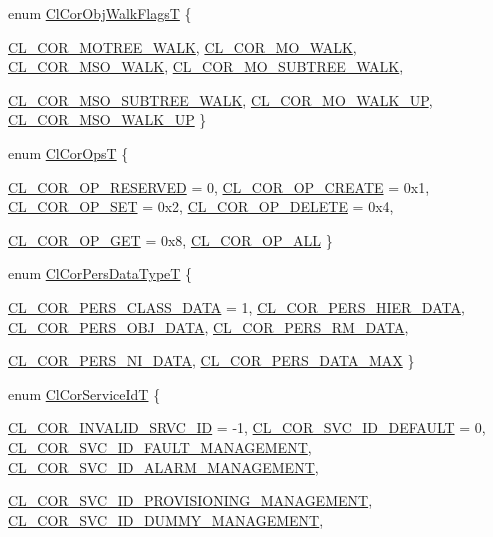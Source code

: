 \begin{CompactItemize}
enum \hyperlink{group__group13_ga331}{Cl\-Cor\-Obj\-Walk\-Flags\-T} \{ \par
\hyperlink{group__group13_gga331a136}{CL\_\-COR\_\-MOTREE\_\-WALK}, 
\hyperlink{group__group13_gga331a137}{CL\_\-COR\_\-MO\_\-WALK}, 
\hyperlink{group__group13_gga331a138}{CL\_\-COR\_\-MSO\_\-WALK}, 
\hyperlink{group__group13_gga331a139}{CL\_\-COR\_\-MO\_\-SUBTREE\_\-WALK}, 
\par
\hyperlink{group__group13_gga331a140}{CL\_\-COR\_\-MSO\_\-SUBTREE\_\-WALK}, 
\hyperlink{group__group13_gga331a141}{CL\_\-COR\_\-MO\_\-WALK\_\-UP}, 
\hyperlink{group__group13_gga331a142}{CL\_\-COR\_\-MSO\_\-WALK\_\-UP}
 \}
\item 
enum \hyperlink{group__group13_ga333}{Cl\-Cor\-Ops\-T} \{ \par
\hyperlink{group__group13_gga333a145}{CL\_\-COR\_\-OP\_\-RESERVED} =  0, 
\hyperlink{group__group13_gga333a146}{CL\_\-COR\_\-OP\_\-CREATE} =  0x1, 
\hyperlink{group__group13_gga333a147}{CL\_\-COR\_\-OP\_\-SET} =  0x2, 
\hyperlink{group__group13_gga333a148}{CL\_\-COR\_\-OP\_\-DELETE} =  0x4, 
\par
\hyperlink{group__group13_gga333a149}{CL\_\-COR\_\-OP\_\-GET} =  0x8, 
\hyperlink{group__group13_gga333a150}{CL\_\-COR\_\-OP\_\-ALL}
 \}
\item 
enum \hyperlink{group__group13_ga340}{Cl\-Cor\-Pers\-Data\-Type\-T} \{ \par
\hyperlink{group__group13_gga340a4}{CL\_\-COR\_\-PERS\_\-CLASS\_\-DATA} =  1, 
\hyperlink{group__group13_gga340a5}{CL\_\-COR\_\-PERS\_\-HIER\_\-DATA}, 
\hyperlink{group__group13_gga340a6}{CL\_\-COR\_\-PERS\_\-OBJ\_\-DATA}, 
\hyperlink{group__group13_gga340a7}{CL\_\-COR\_\-PERS\_\-RM\_\-DATA}, 
\par
\hyperlink{group__group13_gga340a8}{CL\_\-COR\_\-PERS\_\-NI\_\-DATA}, 
\hyperlink{group__group13_gga340a9}{CL\_\-COR\_\-PERS\_\-DATA\_\-MAX}
 \}
\item 
enum \hyperlink{group__group13_ga339}{Cl\-Cor\-Service\-Id\-T} \{ \par
\hyperlink{group__group13_gga339a0}{CL\_\-COR\_\-INVALID\_\-SRVC\_\-ID} =  -1, 
\hyperlink{group__group13_gga339a1}{CL\_\-COR\_\-SVC\_\-ID\_\-DEFAULT} =  0, 
\hyperlink{group__group13_gga339a2}{CL\_\-COR\_\-SVC\_\-ID\_\-FAULT\_\-MANAGEMENT}, 
\hyperlink{group__group13_gga339a3}{CL\_\-COR\_\-SVC\_\-ID\_\-ALARM\_\-MANAGEMENT}, 
\par
\hyperlink{group__group13_gga339a4}{CL\_\-COR\_\-SVC\_\-ID\_\-PROVISIONING\_\-MANAGEMENT}, 
\hyperlink{group__group13_gga339a5}{CL\_\-COR\_\-SVC\_\-ID\_\-DUMMY\_\-MANAGEMENT}, 

\end{CompactItemize}
